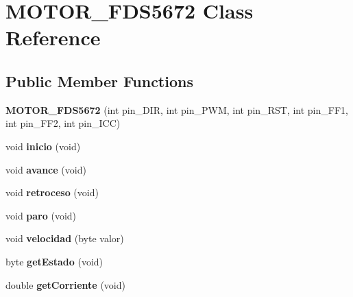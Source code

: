 \hypertarget{class_m_o_t_o_r___f_d_s5672}{}\section{M\+O\+T\+O\+R\+\_\+\+F\+D\+S5672 Class Reference}
\label{class_m_o_t_o_r___f_d_s5672}
\subsection*{Public Member Functions}
\begin{DoxyCompactItemize}
\item 
{\bfseries M\+O\+T\+O\+R\+\_\+\+F\+D\+S5672} (int pin\+\_\+\+D\+IR, int pin\+\_\+\+P\+WM, int pin\+\_\+\+R\+ST, int pin\+\_\+\+F\+F1, int pin\+\_\+\+F\+F2, int pin\+\_\+\+I\+CC)\hypertarget{class_m_o_t_o_r___f_d_s5672_aaa522a9941c463648bd81a9987845feb}{}\label{class_m_o_t_o_r___f_d_s5672_aaa522a9941c463648bd81a9987845feb}

\item 
void {\bfseries inicio} (void)\hypertarget{class_m_o_t_o_r___f_d_s5672_a07d9cad58ec53e39de40ae23ba270971}{}\label{class_m_o_t_o_r___f_d_s5672_a07d9cad58ec53e39de40ae23ba270971}

\item 
void {\bfseries avance} (void)\hypertarget{class_m_o_t_o_r___f_d_s5672_a880d00a17a8fb6f11a13f869792bbe7c}{}\label{class_m_o_t_o_r___f_d_s5672_a880d00a17a8fb6f11a13f869792bbe7c}

\item 
void {\bfseries retroceso} (void)\hypertarget{class_m_o_t_o_r___f_d_s5672_ad91b7a9afdc1433271167f67370bf688}{}\label{class_m_o_t_o_r___f_d_s5672_ad91b7a9afdc1433271167f67370bf688}

\item 
void {\bfseries paro} (void)\hypertarget{class_m_o_t_o_r___f_d_s5672_adfb9be12cbfc71e7441324b189657fa5}{}\label{class_m_o_t_o_r___f_d_s5672_adfb9be12cbfc71e7441324b189657fa5}

\item 
void {\bfseries velocidad} (byte valor)\hypertarget{class_m_o_t_o_r___f_d_s5672_a0394264f654690475881ce0e073225c3}{}\label{class_m_o_t_o_r___f_d_s5672_a0394264f654690475881ce0e073225c3}

\item 
byte {\bfseries get\+Estado} (void)\hypertarget{class_m_o_t_o_r___f_d_s5672_a7e856cfd145782f6f3edc9de7c511a1d}{}\label{class_m_o_t_o_r___f_d_s5672_a7e856cfd145782f6f3edc9de7c511a1d}

\item 
double {\bfseries get\+Corriente} (void)\hypertarget{class_m_o_t_o_r___f_d_s5672_a916dc06a24d8eeae7d35a9b3e105490e}{}\label{class_m_o_t_o_r___f_d_s5672_a916dc06a24d8eeae7d35a9b3e105490e}

\end{DoxyCompactItemize}


